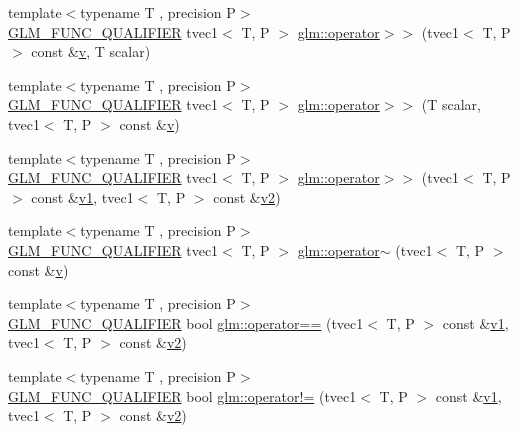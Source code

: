 \begin{DoxyCompactItemize}
\item 
{\footnotesize template$<$typename T , precision P$>$ }\\\mbox{\hyperlink{setup_8hpp_a33fdea6f91c5f834105f7415e2a64407}{G\+L\+M\+\_\+\+F\+U\+N\+C\+\_\+\+Q\+U\+A\+L\+I\+F\+I\+ER}} tvec1$<$ T, P $>$ \mbox{\hyperlink{namespaceglm_a110cd8087319dc63789524a225924807}{glm\+::operator$>$$>$}} (tvec1$<$ T, P $>$ const \&\mbox{\hyperlink{glad_8h_a14cfbe2fc2234f5504618905b69d1e06}{v}}, T scalar)
\item 
{\footnotesize template$<$typename T , precision P$>$ }\\\mbox{\hyperlink{setup_8hpp_a33fdea6f91c5f834105f7415e2a64407}{G\+L\+M\+\_\+\+F\+U\+N\+C\+\_\+\+Q\+U\+A\+L\+I\+F\+I\+ER}} tvec1$<$ T, P $>$ \mbox{\hyperlink{namespaceglm_abb3e6d01d8d8806a7fe8b4d3c30deeb6}{glm\+::operator$>$$>$}} (T scalar, tvec1$<$ T, P $>$ const \&\mbox{\hyperlink{glad_8h_a14cfbe2fc2234f5504618905b69d1e06}{v}})
\item 
{\footnotesize template$<$typename T , precision P$>$ }\\\mbox{\hyperlink{setup_8hpp_a33fdea6f91c5f834105f7415e2a64407}{G\+L\+M\+\_\+\+F\+U\+N\+C\+\_\+\+Q\+U\+A\+L\+I\+F\+I\+ER}} tvec1$<$ T, P $>$ \mbox{\hyperlink{namespaceglm_adbb2f50e95ea7aa74355eb231a305436}{glm\+::operator$>$$>$}} (tvec1$<$ T, P $>$ const \&\mbox{\hyperlink{glad_8h_a0779c3b73f9aa3a0ac5b0139b5d291d9}{v1}}, tvec1$<$ T, P $>$ const \&\mbox{\hyperlink{glad_8h_a9a09a1837922b2b806f4589096a52049}{v2}})
\item 
{\footnotesize template$<$typename T , precision P$>$ }\\\mbox{\hyperlink{setup_8hpp_a33fdea6f91c5f834105f7415e2a64407}{G\+L\+M\+\_\+\+F\+U\+N\+C\+\_\+\+Q\+U\+A\+L\+I\+F\+I\+ER}} tvec1$<$ T, P $>$ \mbox{\hyperlink{namespaceglm_abf218640e6cefd3d973d4cdce34795ff}{glm\+::operator$\sim$}} (tvec1$<$ T, P $>$ const \&\mbox{\hyperlink{glad_8h_a14cfbe2fc2234f5504618905b69d1e06}{v}})
\item 
{\footnotesize template$<$typename T , precision P$>$ }\\\mbox{\hyperlink{setup_8hpp_a33fdea6f91c5f834105f7415e2a64407}{G\+L\+M\+\_\+\+F\+U\+N\+C\+\_\+\+Q\+U\+A\+L\+I\+F\+I\+ER}} bool \mbox{\hyperlink{namespaceglm_a1903ed3e722222dd83e25a2f6a82782c}{glm\+::operator==}} (tvec1$<$ T, P $>$ const \&\mbox{\hyperlink{glad_8h_a0779c3b73f9aa3a0ac5b0139b5d291d9}{v1}}, tvec1$<$ T, P $>$ const \&\mbox{\hyperlink{glad_8h_a9a09a1837922b2b806f4589096a52049}{v2}})
\item 
{\footnotesize template$<$typename T , precision P$>$ }\\\mbox{\hyperlink{setup_8hpp_a33fdea6f91c5f834105f7415e2a64407}{G\+L\+M\+\_\+\+F\+U\+N\+C\+\_\+\+Q\+U\+A\+L\+I\+F\+I\+ER}} bool \mbox{\hyperlink{namespaceglm_adbcfa5a99a45ab48706d1c04b364aad7}{glm\+::operator!=}} (tvec1$<$ T, P $>$ const \&\mbox{\hyperlink{glad_8h_a0779c3b73f9aa3a0ac5b0139b5d291d9}{v1}}, tvec1$<$ T, P $>$ const \&\mbox{\hyperlink{glad_8h_a9a09a1837922b2b806f4589096a52049}{v2}})

\end{DoxyCompactItemize}
